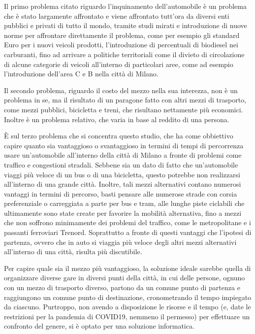 Il primo problema citato riguardo l'inquinamento dell'automobile è un problema che è stato largamente affrontato e viene affrontato tutt'ora da diversi enti pubblici e privati di tutto il mondo, tramite studi mirati e introduzione di nuove norme per affrontare direttamente il problema, come per esempio gli standard Euro per i nuovi veicoli prodotti, l'introduzione di percentuali di biodiesel nei carburanti, fino ad arrivare a politiche territoriali come il divieto di circolazione di alcune categorie di veicoli all'interno di particolari aree, come ad esempio l'introduzione dell'area C e B nella città di Milano.

Il secondo problema, riguardo il costo del mezzo nella sua interezza, non è un problema in se, ma il risultato di un paragone fatto con altri mezzi di trasporto, come mezzi pubblici, bicicletta e treni, che risultano nettamente più economici. Inoltre è un problema relativo, che varia in base al reddito di una persona.

È sul terzo problema che si concentra questo studio, che ha come obbiettivo capire quanto sia vantaggioso o svantaggioso in termini di tempi di percorrenza usare un'automobile all'interno della città di Milano a fronte di problemi come traffico e congestioni stradali.
Sebbene sia un dato di fatto che un'automobile viaggi più veloce di un bus o di una bicicletta, questo potrebbe non realizzarsi all'interno di una grande città. Inoltre, tali mezzi alternativi contano numerosi vantaggi in termini di percorso, basti pensare alle numerose strade con corsia preferenziale o carreggiata a parte per bus e tram, alle lunghe piste ciclabili che ultimamente sono state create per favorire la mobilità alternativa, fino a mezzi che non soffrono minimamente dei problemi del traffico, come le metropolitane e i passanti ferroviari Trenord. Soprattutto a fronte di questi vantaggi che l'ipotesi di partenza, ovvero che in auto si viaggia più veloce degli altri mezzi alternativi all'interno di una città, risulta più discutibile.

Per capire quale sia il mezzo più vantaggioso, la soluzione ideale sarebbe quella di organizzare diverse gare in diversi punti della città, in cui delle persone, ognuno con un mezzo di trasporto diverso, partono da un comune punto di partenza e raggiungono un comune punto di destinazione, cronometrando il tempo impiegato da ciascuno. Purtroppo, non avendo a disposizione le risorse e il tempo (e, date le restrizioni per la pandemia di COVID19, nemmeno il permesso) per effettuare un confronto del genere, si è optato per una soluzione informatica.